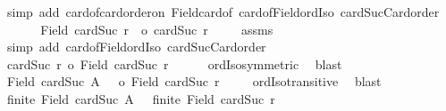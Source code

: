\begin{isabellebody}
\ {\isacharparenleft}{\kern0pt}simp\ add{\isacharcolon}{\kern0pt}\ card{\isacharunderscore}{\kern0pt}of{\isacharunderscore}{\kern0pt}card{\isacharunderscore}{\kern0pt}order{\isacharunderscore}{\kern0pt}on\ Field{\isacharunderscore}{\kern0pt}card{\isacharunderscore}{\kern0pt}of\ card{\isacharunderscore}{\kern0pt}of{\isacharunderscore}{\kern0pt}Field{\isacharunderscore}{\kern0pt}ordIso\ cardSuc{\isacharunderscore}{\kern0pt}Card{\isacharunderscore}{\kern0pt}order{\isacharparenright}{\kern0pt}\isanewline
\ \ \isamarkupfalse%
\isanewline
\ \ \isacommand{{\isacharbraceleft}{\kern0pt}}\isamarkupfalse%
\isamarkupfalse%
\ {\isachardoublequoteopen}{\isacharbar}{\kern0pt}Field\ {\isacharparenleft}{\kern0pt}cardSuc\ r{\isacharparenright}{\kern0pt}\ {\isacharbar}{\kern0pt}\ {\isacharequal}{\kern0pt}o\ cardSuc\ r{\isachardoublequoteclose}\isanewline
\ \ \ \isamarkupfalse%
\ assms\ \isamarkupfalse%
\ {\isacharparenleft}{\kern0pt}simp\ add{\isacharcolon}{\kern0pt}\ card{\isacharunderscore}{\kern0pt}of{\isacharunderscore}{\kern0pt}Field{\isacharunderscore}{\kern0pt}ordIso\ cardSuc{\isacharunderscore}{\kern0pt}Card{\isacharunderscore}{\kern0pt}order{\isacharparenright}{\kern0pt}\isanewline
\ \ \ \isamarkupfalse%
\ {\isachardoublequoteopen}cardSuc\ r\ {\isacharequal}{\kern0pt}o\ {\isacharbar}{\kern0pt}Field\ {\isacharparenleft}{\kern0pt}cardSuc\ r{\isacharparenright}{\kern0pt}\ {\isacharbar}{\kern0pt}{\isachardoublequoteclose}\isanewline
\ \ \ \isamarkupfalse%
\ ordIso{\isacharunderscore}{\kern0pt}symmetric\ \isamarkupfalse%
\ blast\isanewline
\ \ \isacommand{{\isacharbraceright}{\kern0pt}}\isamarkupfalse%
\isanewline
\ \ \isamarkupfalse%
\ \isamarkupfalse%
\ {\isachardoublequoteopen}{\isacharbar}{\kern0pt}Field\ {\isacharparenleft}{\kern0pt}cardSuc\ {\isacharbar}{\kern0pt}{\isacharquery}{\kern0pt}A{\isacharbar}{\kern0pt}\ {\isacharparenright}{\kern0pt}\ {\isacharbar}{\kern0pt}\ {\isacharequal}{\kern0pt}o\ {\isacharbar}{\kern0pt}Field\ {\isacharparenleft}{\kern0pt}cardSuc\ r{\isacharparenright}{\kern0pt}\ {\isacharbar}{\kern0pt}{\isachardoublequoteclose}\isanewline
\ \ \isamarkupfalse%
\ ordIso{\isacharunderscore}{\kern0pt}transitive\ \isamarkupfalse%
\ blast\isanewline
\ \ \isamarkupfalse%
\ {\isachardoublequoteopen}finite\ {\isacharparenleft}{\kern0pt}Field\ {\isacharparenleft}{\kern0pt}cardSuc\ {\isacharbar}{\kern0pt}{\isacharquery}{\kern0pt}A{\isacharbar}{\kern0pt}\ {\isacharparenright}{\kern0pt}{\isacharparenright}{\kern0pt}\ {\isacharequal}{\kern0pt}\ finite\ {\isacharparenleft}{\kern0pt}Field\ {\isacharparenleft}{\kern0pt}cardSuc\ r{\isacharparenright}{\kern0pt}{\isacharparenright}{\kern0pt}{\isachardoublequoteclose}\isanewline

\end{isabellebody}
